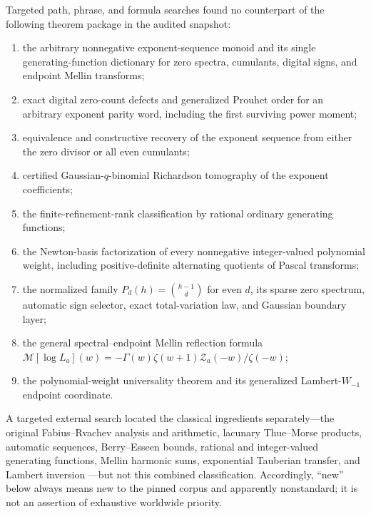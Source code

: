 \documentclass[11pt,oneside]{article}
\numberwithin{equation}{section}
\theoremstyle{definition}
\theoremstyle{remark}
\newcommand{\Mellin}{\mathcal M}
\begin{document}
Targeted path, phrase, and formula searches found no counterpart of the following theorem
package in the audited snapshot:
\begin{enumerate}
\item the arbitrary nonnegative exponent-sequence monoid and its single generating-function
      dictionary for zero spectra, cumulants, digital signs, and endpoint Mellin transforms;
\item exact digital zero-count defects and generalized Prouhet order for an arbitrary
      exponent parity word, including the first surviving power moment;
\item equivalence and constructive recovery of the exponent sequence from either the zero
      divisor or all even cumulants;
\item certified Gaussian-$q$-binomial Richardson tomography of the exponent coefficients;
\item the finite-refinement-rank classification by rational ordinary generating functions;
\item the Newton-basis factorization of every nonnegative integer-valued polynomial weight,
      including positive-definite alternating quotients of Pascal transforms;
\item the normalized family $P_d(h)=\binom{h-1}{d}$ for even $d$, its sparse zero spectrum,
      automatic sign selector, exact total-variation law, and Gaussian boundary layer;
\item the general spectral--endpoint Mellin reflection formula
      $\Mellin[\log L_a](w)=-\Gamma(w)\zeta(w+1)\mathcal Z_a(-w)/\zeta(-w)$;
\item the polynomial-weight universality theorem and its generalized Lambert-$W_{-1}$
      endpoint coordinate.
\end{enumerate}

A targeted external search located the classical ingredients separately---the original
Fabius--Rvachev analysis and arithmetic, lacunary Thue--Morse products, automatic sequences,
Berry--Esseen bounds, rational and integer-valued generating functions, Mellin harmonic sums,
exponential Tauberian transfer, and Lambert inversion
\cite{p1:arias1982,p1:arias2017,p1:aistleitner2015,p1:toth2022,p1:alloucheShallit,p1:petrov1995,p1:stanley1997,p1:flajolet1995,p1:debruijn1959,p1:corless1996}---but not this combined classification.
Accordingly, ``new'' below always means new to the pinned corpus and apparently nonstandard;
it is not an assertion of exhaustive worldwide priority.
\end{document}
